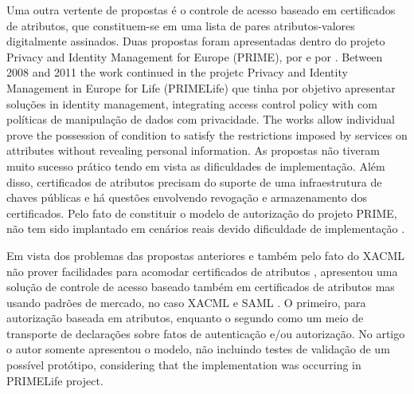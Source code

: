 \documentclass{doublecol-new}
\begin{document}
Uma outra vertente de propostas é o controle de acesso baseado em certificados de atributos, que constituem-se em uma lista de pares atributos-valores digitalmente assinados. Duas propostas foram apresentadas dentro do projeto Privacy and Identity Management for Europe (PRIME), por \citep{ardagna2008privacy} e por \citep{ardagna2010exploiting}. Between 2008 and 2011 the work continued in the projetc Privacy and Identity Management in Europe for Life (PRIMELife) que tinha por objetivo apresentar soluções in identity management, integrating access control policy with com políticas de manipulação de dados com privacidade. The works allow individual prove the possession of condition to satisfy the restrictions imposed by services on attributes without revealing personal information. As propostas não tiveram muito sucesso prático tendo em vista as dificuldades de implementação. Além disso, certificados de atributos precisam do suporte de uma infraestrutura de chaves públicas e há questões envolvendo revogação e armazenamento dos certificados. Pelo fato de constituir o modelo de autorização do projeto PRIME, não tem sido implantado em cenários reais devido dificuldade de implementação \cite{ardagna2010enabling}.

Em vista dos problemas das propostas anteriores e também pelo fato do XACML não prover facilidades para acomodar certificados de atributos \citep{dagdee2011extending}, \citep{ardagna2010enabling} apresentou uma solução de controle de acesso baseado também em certificados de atributos mas usando padrões de mercado, no caso XACML \citep{rissanen2013extensible} e SAML \citep{ragouzis2008security}. O primeiro, para autorização baseada em atributos, enquanto o segundo como um meio de transporte de declarações sobre fatos de autenticação e/ou autorização. No artigo o autor somente apresentou o modelo, não incluindo testes de validação de um possível protótipo, considering that the implementation was occurring in PRIMELife project.
\end{document}
